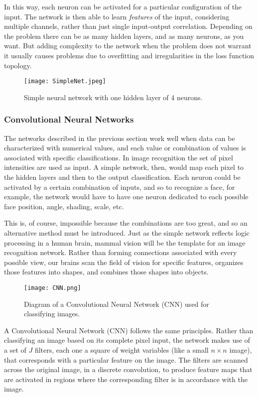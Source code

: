 \documentclass[twoside,twocolumn]{article}
\begin{document}
In this way, each neuron can be activated for a particular configuration of the input. The network is then able to learn \textit{features} of the input, considering multiple channels, rather than just single input-output correlation. Depending on the problem there can be as many hidden layers, and as many neurons, as you want. But adding complexity to the network when the problem does not warrant it usually causes problems due to overfitting and irregularities in the loss function topology.

\begin{figure}
    \centering
    \texttt{[image: SimpleNet.jpeg]}
    \caption{Simple neural network with one hidden layer of 4 neurons.}
    \label{fig:SimpleNet}
\end{figure}

\subsubsection{Convolutional Neural Networks}

The networks described in the previous section work well when data can be characterized with numerical values, and each value or combination of values is associated with specific classifications. In image recognition the set of pixel intensities are used as input. A simple network, then, would map each pixel to the hidden layers and then to the output classification. Each neuron could be activated by a certain combination of inputs, and so to recognize a face, for example, the network would have to have one neuron dedicated to each possible face position, angle, shading, scale, etc.

This is, of course, impossible because the combinations are too great, and so an alternative method must be introduced. Just as the simple network reflects logic processing in a human brain, mammal vision will be the template for an image recognition network. Rather than forming connections associated with every possible view, our brains scan the field of vision for specific features, organizes those features into shapes, and combines those shapes into objects.

\begin{figure}[ht]
    \centering
    \texttt{[image: CNN.png]}
    \caption{Diagram of a Convolutional Neural Network (CNN) used for classifying images.}
    \label{fig:CNN}
\end{figure}

A Convolutional Neural Network (CNN) follows the same principles. Rather than classifying an image based on its complete pixel input, the network makes use of a set of $J$ filters, each one a square of weight variables (like a small $n\times n$ image), that corresponds with a particular feature on the image. The filters are scanned across the original image, in a discrete convolution, to produce feature maps that are activated in regions where the corresponding filter is in accordance with the image.
\end{document}
